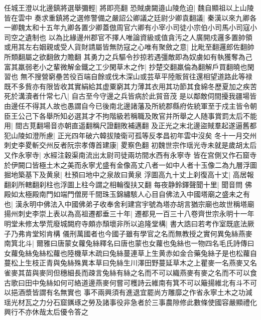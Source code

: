 任城王澄以北邊鎮將選舉彌輕|{
	將即亮翻}
恐賊虜闚邉山陵危迫|{
	魏自顯祖以上山陵皆在雲中}
奏求重鎮將之選修警備之嚴詔公卿議之廷尉少卿袁翻議|{
	秦漢以來九卿各一卿魏太和十五年九卿各置少卿蓋倣周官六卿有小宰小司徒小宗伯小司馬小司寇小司空之遺制也}
以為比緣邊州郡官不擇人唯論資級或值貪汚之人廣開戍邏多置帥領或用其左右姻親或受人貨財請屬皆無防寇之心唯有聚斂之意|{
	比毗至翻邏郎佐翻帥所類翻屬之欲翻斂力贍翻}
其勇力之兵驅令抄掠若遇彊敵即為奴虜如有執獲奪為己富其羸弱老小之輩微解金鐵之工少閑草木之作|{
	抄楚交翻羸倫為翻解戶買翻曉也閑習也}
無不搜營窮壘苦役百端自餘或伐木深山或芸草平陸販貿往還相望道路此等禄既不多貲亦有限皆收其實絹給其虚粟窮其力薄其衣用其功節其食綿冬歷夏加之疾苦死於溝瀆者什常七八|{
	自古至今守邊之兵皆病於此貿音茂}
是以鄰敵伺間擾我疆場皆由邊任不得其人故也愚謂自今已後南北邊諸藩及所統郡縣府佐統軍至于戍主皆令朝臣王公己下各舉所知必選其才不拘階級若稱職及敗官并所舉之人随事賞罰太后不能用|{
	間古莧翻場音亦朝直遥翻稱尺證翻敗補邁翻}
及正光之末北邊盜賊羣起遂逼舊都犯山陵如澄所慮|{
	正光四年破六韓拔陵衛可孤等反孝昌初年雲中沒矣}
冬十一月交州刺史李畟斬交州反者阮宗孝傳首建康|{
	畟察色翻}
初魏世宗作瑶光寺未就是歲胡太后又作永寧寺|{
	水經注穀渠南流出太尉司徒兩坊間水西有永寧寺}
皆在宫側又作石窟寺於伊闕口皆極土木之美而永寧尤盛有金像高丈八者一如中人者十玉像二為九層浮圖掘地築基下及黄泉|{
	杜預曰地中之泉故曰黄泉}
浮圖高九十丈上刹復高十丈|{
	高居報翻刹所轄翻刹柱也浮圖上柱今謂之相輪復扶又翻}
每夜静鈴鐸聲聞十里|{
	聞音問}
佛殿如太極殿南門如端門僧房千間珠玉錦繡駭人心目自佛法入中國塔廟之盛未之有也|{
	漢永明中佛法入中國佛弟子收奉舍利建宫宇號為塔亦胡言猶宗廟也故世稱塔廟}
揚州刺史李崇上表以為高祖遷都垂三十年|{
	遷都見一百三十八卷齊世宗永明十一年}
明堂未修太學荒廢城闕府寺頗亦頹壞非所以追隆堂構|{
	書大誥曰若考作室既底法厥子乃弗肯堂矧肯構}
儀刑萬國者也今國子雖有學官之名而無教授之實何異兔絲燕麥南箕北斗|{
	爾雅曰唐蒙女蘿兔絲釋名曰唐也蒙也女蘿也兔絲也一物四名毛氏詩傳曰女蘿兔絲兔絲松蘿也陸機草木疏曰兔絲蔓連草上生黄赤如金合藥兔絲子是也松蘿自蔓松上生枝正青與兔絲殊異本草曰免絲生川澤田野蔓延草木之上瞿麥一名燕麥又名雀麥其苗與麥同但穗細長而疎言兔絲有絲之名而不可以織燕麥有麥之名而不可以食古歌曰田中兔絲如何可絡道邊燕麥何嘗可穫詩云維南有箕不可以簸揚維北有斗不可以挹酒漿皆謂有名無實也}
事不兩興須有進退宜罷尚方雕靡之作省永寧土木之功減瑶光材瓦之力分石窟䥴琢之勞及諸事役非急者於三事農隙修此數條使國容嚴顯禮化興行不亦休哉太后優令答之

